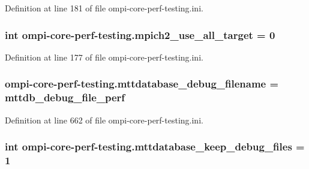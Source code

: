 Definition at line 181 of file ompi-\/core-\/perf-\/testing.\-ini.

\hypertarget{namespaceompi-core-perf-testing_aee0e6469e24a5453a105598477ece09c}{
\subsubsection[{mpich2\-\_\-use\-\_\-all\-\_\-target}]{\setlength{\rightskip}{0pt plus 5cm}int ompi-\/core-\/perf-\/testing.\-mpich2\-\_\-use\-\_\-all\-\_\-target = 0}}\label{namespaceompi-core-perf-testing_aee0e6469e24a5453a105598477ece09c}


Definition at line 177 of file ompi-\/core-\/perf-\/testing.\-ini.

\hypertarget{namespaceompi-core-perf-testing_aa202757325f3ac17b03ad53c9f292bba}{
\subsubsection[{mttdatabase\-\_\-debug\-\_\-filename}]{\setlength{\rightskip}{0pt plus 5cm}ompi-\/core-\/perf-\/testing.\-mttdatabase\-\_\-debug\-\_\-filename = mttdb\-\_\-debug\-\_\-file\-\_\-perf}}\label{namespaceompi-core-perf-testing_aa202757325f3ac17b03ad53c9f292bba}


Definition at line 662 of file ompi-\/core-\/perf-\/testing.\-ini.

\hypertarget{namespaceompi-core-perf-testing_a846e25faa34713db3648a273bc6baead}{
\subsubsection[{mttdatabase\-\_\-keep\-\_\-debug\-\_\-files}]{\setlength{\rightskip}{0pt plus 5cm}int ompi-\/core-\/perf-\/testing.\-mttdatabase\-\_\-keep\-\_\-debug\-\_\-files = 1}}\label{namespaceompi-core-perf-testing_a846e25faa34713db3648a273bc6baead}


